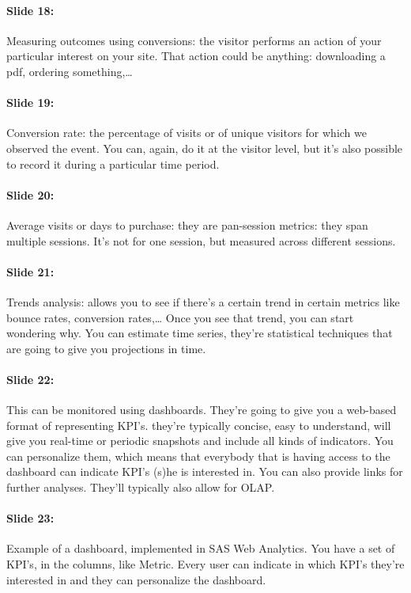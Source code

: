 \documentclass[10pt,a4paper]{report}
\begin{document}
\paragraph{Slide 18:}Measuring outcomes using conversions: the visitor performs an action of your particular interest on your site. That action could be anything: downloading a pdf, ordering something,… 

\paragraph{Slide 19:}Conversion rate: the percentage of visits or of unique visitors for which we observed the event. You can, again, do it at the visitor level, but it's also possible to record it during a particular time period. 

\paragraph{Slide 20:}Average visits or days to purchase: they are pan-session metrics: they span multiple sessions. It's not for one session, but measured across different sessions. 

\paragraph{Slide 21:}Trends analysis: allows you to see if there's a certain trend in certain metrics like bounce rates, conversion rates,… Once you see that trend, you can start wondering why.
You can estimate time series, they're statistical techniques that are going to give you projections in time. 

\paragraph{Slide 22:}This can be monitored using dashboards. They're going to give you a web-based format of representing KPI's. they're typically concise, easy to understand, will give you real-time or periodic snapshots and include all kinds of indicators. You can personalize them, which means that everybody that is having access to the dashboard can indicate KPI's (s)he is interested in. You can also provide links for further analyses. They'll typically also allow for OLAP.

\paragraph{Slide 23:}Example of a dashboard, implemented in SAS Web Analytics. You have a set of KPI's, in the columns, like Metric. Every user can indicate in which KPI's they're interested in and they can personalize the dashboard.
\end{document}
